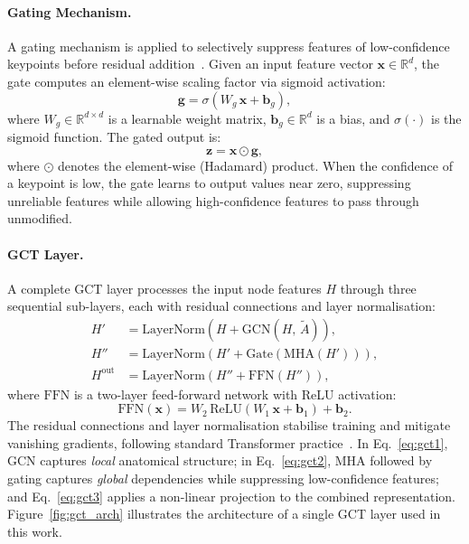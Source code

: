 \documentclass{article}
\begin{document}
\paragraph{Gating Mechanism.}
A gating mechanism is applied to selectively suppress features of
low-confidence keypoints before residual addition~\cite{ji2025gct}.
Given an input feature vector $\mathbf{x} \in \mathbb{R}^d$, the gate
computes an element-wise scaling factor via sigmoid activation:
\begin{equation}
  \mathbf{g} = \sigma\!\left(W_g\,\mathbf{x} + \mathbf{b}_g\right),
  \label{eq:gate}
\end{equation}
where $W_g \in \mathbb{R}^{d \times d}$ is a learnable weight matrix,
$\mathbf{b}_g \in \mathbb{R}^d$ is a bias, and $\sigma(\cdot)$ is the
sigmoid function.
The gated output is:
\begin{equation}
  \mathbf{z} = \mathbf{x} \odot \mathbf{g},
  \label{eq:gated_output}
\end{equation}
where $\odot$ denotes the element-wise (Hadamard) product.
When the confidence of a keypoint is low, the gate learns to output values
near zero, suppressing unreliable features while allowing high-confidence
features to pass through unmodified.

\paragraph{GCT Layer.}
A complete GCT layer processes the input node features $H$ through three
sequential sub-layers, each with residual connections and layer
normalisation:
\begin{align}
  H'    &= \mathrm{LayerNorm}\!\left(H   + \mathrm{GCN}(H,\,\tilde{A})\right),
           \label{eq:gct1} \\
  H''   &= \mathrm{LayerNorm}\!\left(H'  + \mathrm{Gate}\!\left(
             \mathrm{MHA}(H')\right)\right),
           \label{eq:gct2} \\
  H^{\mathrm{out}}
        &= \mathrm{LayerNorm}\!\left(H'' + \mathrm{FFN}(H'')\right),
           \label{eq:gct3}
\end{align}
where $\mathrm{FFN}$ is a two-layer feed-forward network with ReLU
activation:
\begin{equation}
  \mathrm{FFN}(\mathbf{x})
    = W_2\,\mathrm{ReLU}(W_1\,\mathbf{x} + \mathbf{b}_1) + \mathbf{b}_2.
  \label{eq:ffn}
\end{equation}
The residual connections and layer normalisation stabilise training and
mitigate vanishing gradients, following standard Transformer
practice~\cite{vaswani2017attention}.
In Eq.~\eqref{eq:gct1}, GCN captures \emph{local} anatomical structure;
in Eq.~\eqref{eq:gct2}, MHA followed by gating captures \emph{global}
dependencies while suppressing low-confidence features; and
Eq.~\eqref{eq:gct3} applies a non-linear projection to the combined
representation.
Figure~\ref{fig:gct_arch} illustrates the architecture of a single GCT
layer used in this work.
\end{document}
